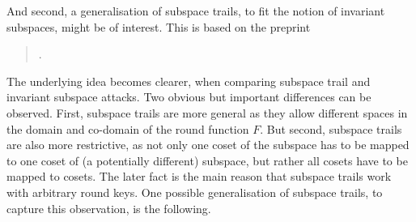 And second, a generalisation of subspace trails, to fit the notion of invariant subspaces, might be of interest.
This is based on the preprint
\begin{quote}
    .
\end{quote}
The underlying idea becomes clearer, when comparing subspace trail and invariant subspace attacks.
Two obvious but important differences can be observed.
First, subspace trails are more general as they allow different spaces in the domain and co-domain of the round function $F$.
But second, subspace trails are also more restrictive, as not only one coset of the subspace has to be mapped to one coset of (a potentially different) subspace, but rather all cosets have to be mapped to cosets.
The later fact is the main reason that subspace trails work with arbitrary round keys.
One possible generalisation of subspace trails, to capture this observation, is the following.

